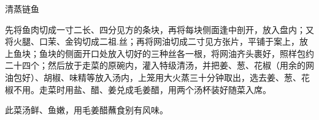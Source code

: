 \begin{recipe}{清蒸链鱼}

\ingredients


\cooking

\step 先将鱼肉切成一寸二长、四分见方的条块，再将每块侧面逢中剖开，放入盘内；又将火腿、口茉、金钩切成二祖.丝；再将网油切成二寸见方张片，平铺于案上，放上鱼块；鱼块的侧面开口处放入切好的三种丝各一根，将网油齐头裹好，照样包约二十四个；然后放于走菜的原碗内，灌入特级清汤，并把姜、葱、花椒（用余的网油包好）、胡椒、味精等放入汤内，上笼用大火蒸三十分钟取出，选去姜、葱、花椒不用。走菜时用盐、醋、姜兑成毛姜醋，用两个汤杯装好随菜入席。

\notes

此菜汤鲜、鱼嫩，用毛姜醋蘸食别有风味。

\end{recipe}

